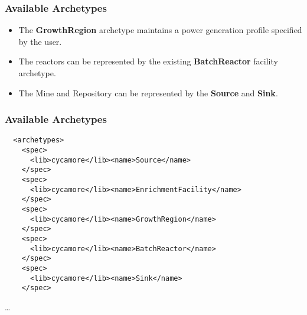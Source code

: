 


\begin{frame}[fragile]
  \frametitle{Available Archetypes}
  \begin{itemize}
\item The \textbf{GrowthRegion} archetype maintains a power generation profile specified by the user. 
\item The reactors can be represented by the existing \textbf{BatchReactor} 
facility archetype.
\item The Mine and Repository can be represented by the \textbf{Source} and 
\textbf{Sink}.
\end{itemize}
\end{frame}

\begin{frame}[fragile]
  \frametitle{Available Archetypes}
\footnotesize{
\begin{lstlisting}
  <archetypes>
    <spec>
      <lib>cycamore</lib><name>Source</name>
    </spec>
    <spec>
      <lib>cycamore</lib><name>EnrichmentFacility</name>
    </spec>
    <spec>
      <lib>cycamore</lib><name>GrowthRegion</name>
    </spec>
    <spec>
      <lib>cycamore</lib><name>BatchReactor</name>
    </spec>
    <spec>
      <lib>cycamore</lib><name>Sink</name>
    </spec>
\end{lstlisting}
\ldots
}
\end{frame}

